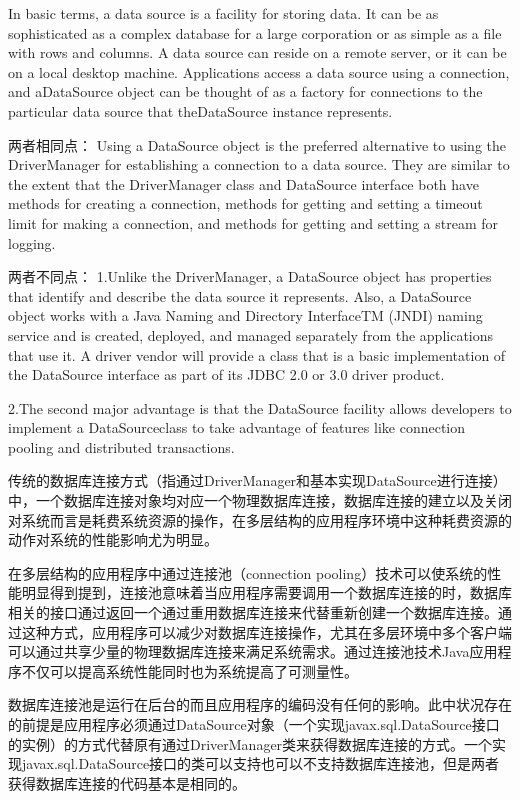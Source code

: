 \documentclass[12pt]{book}
\numberwithin{dummy}{section}
\theoremstyle{ocrenumbox}
\theoremstyle{blacknumex}
\theoremstyle{blacknumbox}
\theoremstyle{ocrenum}
\begin{document}
In basic terms, a data source is a facility for storing data. It can be as sophisticated as a complex database for a large corporation or as simple as a file with rows and columns. A data source can reside on a remote server, or it can be on a local desktop machine. Applications access a data source using a connection, and aDataSource object can be thought of as a factory for connections to the particular data source that theDataSource instance represents.

两者相同点：
Using a DataSource object is the preferred alternative to using the DriverManager for establishing a connection to a data source. They are similar to the extent that the DriverManager class and DataSource interface both have methods for creating a connection, methods for getting and setting a timeout limit for making a connection, and methods for getting and setting a stream for logging.

两者不同点：
1.Unlike the DriverManager, a DataSource object has properties that identify and describe the data source it represents. Also, a DataSource object works with a Java Naming and Directory InterfaceTM (JNDI) naming service and is created, deployed, and managed separately from the applications that use it. A driver vendor will provide a class that is a basic implementation of the DataSource interface as part of its JDBC 2.0 or 3.0 driver product.

2.The second major advantage is that the DataSource facility allows developers to implement a DataSourceclass to take advantage of features like connection pooling and distributed transactions.

传统的数据库连接方式（指通过DriverManager和基本实现DataSource进行连接）中，一个数据库连接对象均对应一个物理数据库连接，数据库连接的建立以及关闭对系统而言是耗费系统资源的操作，在多层结构的应用程序环境中这种耗费资源的动作对系统的性能影响尤为明显。

在多层结构的应用程序中通过连接池（connection pooling）技术可以使系统的性能明显得到提到，连接池意味着当应用程序需要调用一个数据库连接的时，数据库相关的接口通过返回一个通过重用数据库连接来代替重新创建一个数据库连接。通过这种方式，应用程序可以减少对数据库连接操作，尤其在多层环境中多个客户端可以通过共享少量的物理数据库连接来满足系统需求。通过连接池技术Java应用程序不仅可以提高系统性能同时也为系统提高了可测量性。

数据库连接池是运行在后台的而且应用程序的编码没有任何的影响。此中状况存在的前提是应用程序必须通过DataSource对象（一个实现javax.sql.DataSource接口的实例）的方式代替原有通过DriverManager类来获得数据库连接的方式。一个实现javax.sql.DataSource接口的类可以支持也可以不支持数据库连接池，但是两者获得数据库连接的代码基本是相同的。
\end{document}

